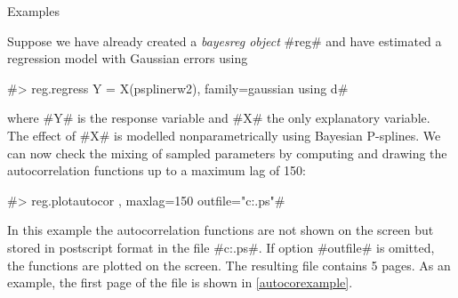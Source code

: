 \begin{stanza}{Examples}

Suppose we have already created a {\em bayesreg object} #reg# and
have estimated a regression model with Gaussian errors using

#> reg.regress Y = X(psplinerw2), family=gaussian using d#

where #Y# is the response variable and #X# the only explanatory
variable. The effect of #X# is modelled nonparametrically  using
Bayesian P-splines. We can now check the mixing of sampled
parameters by computing and drawing the autocorrelation functions
up to a maximum lag of 150:

#> reg.plotautocor , maxlag=150 outfile="c:\results\autocor.ps"#

In this example the autocorrelation functions are not shown on the
screen but stored in postscript format in the file
#c:\results\autocor.ps#. If option #outfile# is omitted, the
functions are plotted on the screen. The resulting file contains 5
pages. As an example, the first page of the file is shown in
\autoref{autocorexample}.


\end{stanza}
